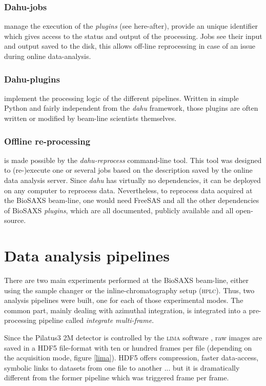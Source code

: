 \documentclass[preprint]{iucr}              %
\begin{document}
\subsubsection{Dahu-jobs}
manage the execution of the \textit{plugins} (see here-after), provide an unique identifier which gives access to the status and output of the processing.
Jobs see their input and output saved to the disk, this allows off-line reprocessing in case of an issue during online data-analysis.

\subsubsection{Dahu-plugins} implement the processing logic of the different pipelines.
Written in simple Python and fairly independent from the \textit{dahu} framework, those plugins are often written or modified by beam-line scientists themselves.

\subsubsection{Offline re-processing}
is made possible by the \textit{dahu-reprocess} command-line tool.
This tool was designed to (re-)execute one or several jobs based on the description saved by the online data analysis server. 
Since \textit{dahu} has virtually no dependencies, it can be deployed on any computer to reprocess data. 
Nevertheless, to reprocess data acquired at the BioSAXS beam-line, one would need FreeSAS and all the other dependencies of BioSAXS \textit{plugins}, which are all documented, publicly available and all open-source.

\section{Data analysis pipelines}
\label{pipeline}
There are two main experiments performed at the BioSAXS beam-line, either using the sample changer or the inline-chromatography setup (\textsc{hplc}).
Thus, two analysis pipelines were built, one for each of those experimental modes.
The common part, mainly dealing with azimuthal integration, is integrated into a pre-processing pipeline called \textit{integrate multi-frame}.

Since the Pilatus3 2M detector is controlled by the \textsc{lima} software \cite{lima}, raw images are saved in a HDF5 file-format \cite{hdf5} with ten or hundred frames per file (depending on the acquisition mode, figure \ref{lima}).
HDF5 offers compression, faster data-access, symbolic links to datasets from one file to another ... but it is dramatically different from the former pipeline which was triggered frame per frame.
\end{document}
